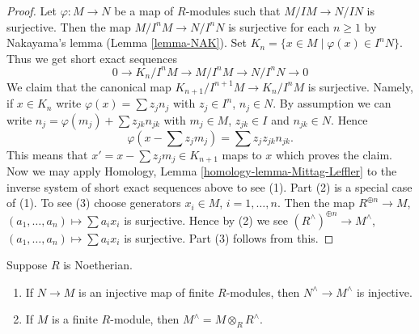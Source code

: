 \begin{proof}
Let $\varphi : M \to N$ be a map of $R$-modules such that
$M/IM \to N/IN$ is surjective.
Then the map $M/I^nM \to N/I^nN$ is surjective for each $n \geq 1$ by
Nakayama's lemma (Lemma \ref{lemma-NAK}). Set
$K_n = \{x \in M \mid \varphi(x) \in I^nN\}$.
Thus we get short exact sequences
$$
0 \to K_n/I^nM \to M/I^nM \to N/I^nN \to 0
$$
We claim that the canonical map $K_{n + 1}/I^{n + 1}M \to K_n/I^nM$
is surjective. Namely, if $x \in K_n$ write
$\varphi(x) = \sum z_j n_j$ with $z_j \in I^n$, $n_j \in N$.
By assumption we can write $n_j = \varphi(m_j) + \sum z_{jk}n_{jk}$
with $m_j \in M$, $z_{jk} \in I$ and $n_{jk} \in N$. Hence
$$
\varphi(x - \sum z_j m_j) = \sum z_jz_{jk} n_{jk}.
$$
This means that $x' = x - \sum z_j m_j \in K_{n + 1}$ maps
to $x$ which proves the claim. Now we may apply
Homology, Lemma \ref{homology-lemma-Mittag-Leffler} to the inverse
system of short exact sequences above to see (1).
Part (2) is a special case of (1).
To see (3) choose generators $x_i \in M$, $i = 1, \ldots, n$.
Then the map $R^{\oplus n} \to M$, $(a_1, \ldots, a_n) \mapsto \sum a_ix_i$
is surjective. Hence by (2) we see
$(R^\wedge)^{\oplus n} \to M^\wedge$, $(a_1, \ldots, a_n) \mapsto \sum a_ix_i$
is surjective. Part (3) follows from this.
\end{proof}

\begin{lemma}
\label{lemma-completion-tensor}
Suppose $R$ is Noetherian.
\begin{enumerate}
\item If $N \to M$ is an injective map of finite $R$-modules,
then $N^\wedge \to M^\wedge$ is injective.
\item If $M$ is a finite $R$-module, then $M^\wedge = M \otimes_R R^\wedge$.
\end{enumerate}
\end{lemma}


